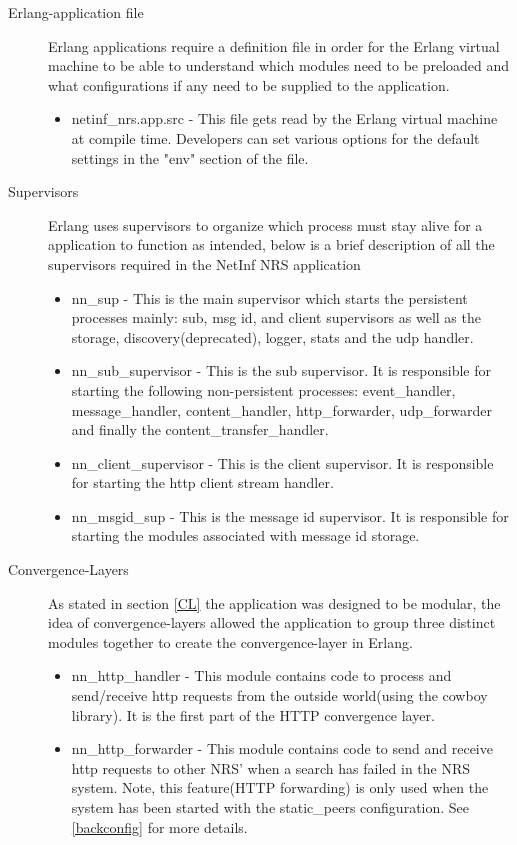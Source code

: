 \begin{description}
\item[Erlang-application file]
Erlang applications require a definition file in order for the Erlang virtual machine to be able to understand which modules need to be preloaded and what configurations if any need to be supplied to the application.
\begin{itemize}
\item netinf\_nrs.app.src - This file gets read by the Erlang virtual machine at compile time. Developers can set various options for the default settings in the "env" section of the file.
\end{itemize}
\item[Supervisors]
Erlang uses supervisors to organize which process must stay alive for a application to function as intended, below is a brief description of all the supervisors required in the NetInf NRS application
\begin{itemize}
\item nn\_sup - This is the main supervisor which starts the persistent processes mainly: sub, msg id, and client supervisors as well as the storage, discovery(deprecated), logger, stats and the udp handler.
\item nn\_sub\_supervisor - This is the sub supervisor. It is responsible for starting the following non-persistent processes: event\_handler, message\_handler, content\_handler, http\_forwarder, udp\_forwarder and finally the content\_transfer\_handler.
\item nn\_client\_supervisor - This is the client supervisor. It is responsible for starting the http client stream handler. 
\item nn\_msgid\_sup - This is the message id supervisor. It is responsible for starting the modules associated with message id storage.
\end{itemize}
\item[Convergence-Layers]
As stated in section \ref{CL} the application was designed to be modular, the idea of convergence-layers allowed the application to group three distinct modules together to create the convergence-layer in Erlang.
\begin{itemize}
\item nn\_http\_handler - This module contains code to process and send/receive http requests from the outside world(using the cowboy library). It is the first part of the HTTP convergence layer.
\item nn\_http\_forwarder - This module contains code to send and receive http requests to other NRS' when a search has failed in the NRS system. Note, this feature(HTTP forwarding) is only used when the system has been started with the static\_peers configuration. See \ref{backconfig} for more details.

\end{itemize}
\end{description}
